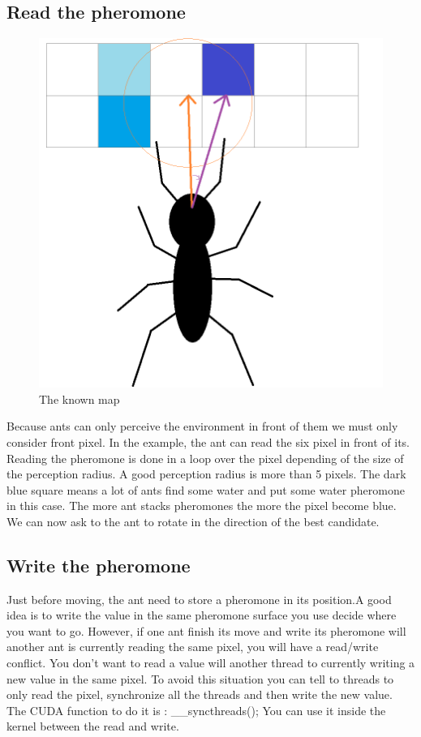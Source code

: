 \documentclass{article}
\begin{document}
\subsection{Read the pheromone}
\begin{figure}[H]
	\centering
	\includegraphics[scale=0.5]{figures/ant_perception.png}
	\caption{The known map}
\end{figure}
Because ants can only perceive the environment in front of them we must only consider front pixel. In the example, the ant can read the six pixel in front of its. Reading the pheromone is done in a loop over the pixel depending of the size of the perception radius. A good perception radius is more than 5 pixels. The dark blue square means a lot of ants find some water and put some water pheromone in this case. The more ant stacks pheromones the more the pixel become blue. We can now ask to the ant to rotate in the direction of the best candidate.
\subsection{Write the pheromone}
Just before moving, the ant need to store a pheromone in its position.A good idea is to write the value in the same pheromone surface you use decide where you want to go. However, if one ant finish its move and write its pheromone will another ant is currently reading the same pixel, you will have a read/write conflict. You don't want to read a value will another thread to currently writing a new value in the same pixel. To avoid this situation you can tell to threads to only read the pixel, synchronize all the threads and then write the new value. The CUDA function to do it is : \_\_syncthreads(); You can use it inside the kernel between the read and write.
\end{document}
